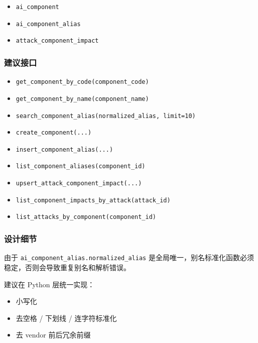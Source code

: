 \documentclass[UTF8]{ctexart}
\providecommand{\tightlist}{%
  \setlength{\itemsep}{0pt}\setlength{\parskip}{0pt}}
\begin{document}
\begin{itemize}
\tightlist
\item
  \texttt{ai\_component}
\item
  \texttt{ai\_component\_alias}
\item
  \texttt{attack\_component\_impact}
\end{itemize}

\hypertarget{ux5efaux8baeux63a5ux53e3-2}{%
\subsubsection{建议接口}\label{ux5efaux8baeux63a5ux53e3-2}}

\begin{itemize}
\tightlist
\item
  \texttt{get\_component\_by\_code(component\_code)}
\item
  \texttt{get\_component\_by\_name(component\_name)}
\item
  \texttt{search\_component\_alias(normalized\_alias,\ limit=10)}
\item
  \texttt{create\_component(...)}
\item
  \texttt{insert\_component\_alias(...)}
\item
  \texttt{list\_component\_aliases(component\_id)}
\item
  \texttt{upsert\_attack\_component\_impact(...)}
\item
  \texttt{list\_component\_impacts\_by\_attack(attack\_id)}
\item
  \texttt{list\_attacks\_by\_component(component\_id)}
\end{itemize}

\hypertarget{ux8bbeux8ba1ux7ec6ux8282-1}{%
\subsubsection{设计细节}\label{ux8bbeux8ba1ux7ec6ux8282-1}}

由于 \texttt{ai\_component\_alias.normalized\_alias}
是全局唯一，别名标准化函数必须稳定，否则会导致重复别名和解析错误。

建议在 Python 层统一实现：

\begin{itemize}
\tightlist
\item
  小写化
\item
  去空格 / 下划线 / 连字符标准化
\item
  去 vendor 前后冗余前缀
\end{itemize}
\end{document}
